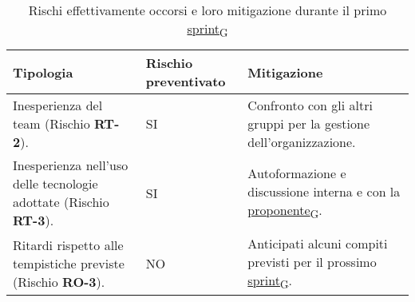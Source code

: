 \newpage
{}
\begin{table}[!h]
	\centering
	\begin{tabular}{ | p{6cm} | p{2.5cm} | p{7.5cm} | }
		\hline
		\textbf{Tipologia}                                                       & \textbf{Rischio preventivato} & \textbf{Mitigazione}                                                \\
		\hline
		Inesperienza del team (Rischio \textbf{RT-2}).                           & SI                            & Confronto con gli altri gruppi per la gestione dell'organizzazione. \\
		\hline
		Inesperienza nell'uso delle tecnologie adottate (Rischio \textbf{RT-3}). & SI                            & Autoformazione e discussione interna e con la \href{https://7last.github.io/docs/rtb/documentazione-interna/glossario\#proponente}{proponente\textsubscript{G}}.           \\
		\hline
		Ritardi rispetto alle tempistiche previste (Rischio \textbf{RO-3}).      & NO                            & Anticipati alcuni compiti previsti per il prossimo \href{https://7last.github.io/docs/rtb/documentazione-interna/glossario\#sprint}{sprint\textsubscript{G}}.          \\
		\hline
	\end{tabular}
	\caption{Rischi effettivamente occorsi e loro mitigazione durante il primo \href{https://7last.github.io/docs/rtb/documentazione-interna/glossario\#sprint}{sprint\textsubscript{G}}}
	
\end{table}

